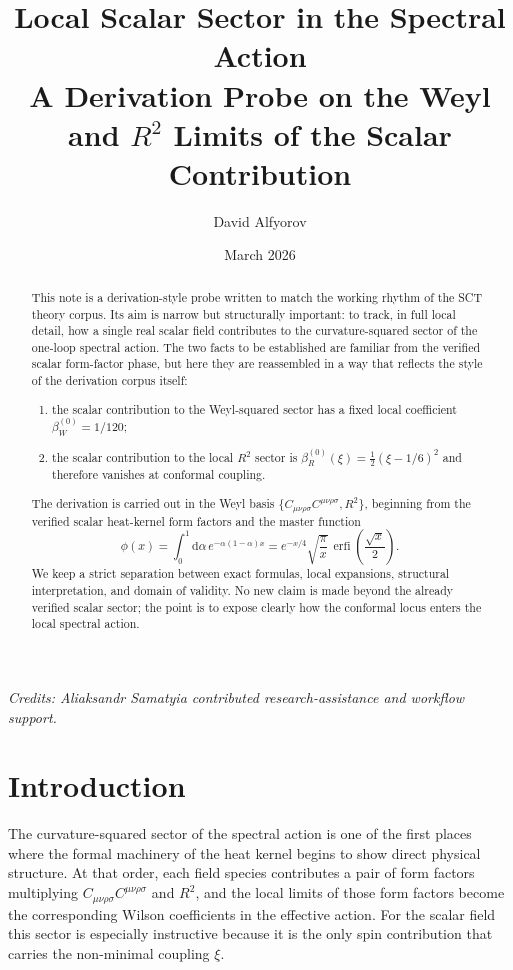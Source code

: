 \documentclass[11pt,a4paper]{article}
\title{%
  \textbf{Local Scalar Sector in the Spectral Action}\\[6pt]
  \large A Derivation Probe on the Weyl and $R^2$ Limits of the Scalar Contribution
}
\author{David Alfyorov}
\date{March 2026}
\newcommand{\dd}{\mathrm{d}}
\newcommand{\Weylsq}{C_{\mu\nu\rho\sigma}C^{\mu\nu\rho\sigma}}
\newcommand{\Rsq}{R^2}
\DeclareMathOperator{\erfi}{erfi}
\theoremstyle{definition}
\theoremstyle{remark}
\begin{document}
\maketitle

\begin{center}
\small\textit{Credits: Aliaksandr Samatyia contributed research-assistance and workflow support.}
\end{center}

\thispagestyle{empty}

\begin{abstract}
This note is a derivation-style probe written to match the working rhythm of
the SCT theory corpus.  Its aim is narrow but structurally important: to
track, in full local detail, how a single real scalar field contributes to
the curvature-squared sector of the one-loop spectral action.  The two facts
to be established are familiar from the verified scalar form-factor phase,
but here they are reassembled in a way that reflects the style of the
derivation corpus itself:
\begin{enumerate}[nosep]
  \item the scalar contribution to the Weyl-squared sector has a fixed local
  coefficient $\beta_W^{(0)} = 1/120$;
  \item the scalar contribution to the local $R^2$ sector is
  $\beta_R^{(0)}(\xi) = \frac{1}{2}(\xi - 1/6)^2$ and therefore vanishes at
  conformal coupling.
\end{enumerate}
The derivation is carried out in the Weyl basis $\{\Weylsq,\Rsq\}$, beginning
from the verified scalar heat-kernel form factors and the master function
\[
  \phi(x) = \int_0^1 \dd\alpha\, e^{-\alpha(1-\alpha)x}
  = e^{-x/4}\sqrt{\frac{\pi}{x}}\,
    \erfi\!\left(\frac{\sqrt{x}}{2}\right).
\]
We keep a strict separation between exact formulas, local expansions,
structural interpretation, and domain of validity.  No new claim is made
beyond the already verified scalar sector; the point is to expose clearly how
the conformal locus enters the local spectral action.
\end{abstract}

\tableofcontents
\newpage

\section{Introduction}
\label{sec:intro}

The curvature-squared sector of the spectral action is one of the first
places where the formal machinery of the heat kernel begins to show direct
physical structure.  At that order, each field species contributes a pair of
form factors multiplying $\Weylsq$ and $\Rsq$, and the local limits of those
form factors become the corresponding Wilson coefficients in the effective
action.  For the scalar field this sector is especially instructive because
it is the only spin contribution that carries the non-minimal coupling
$\xi$.
\end{document}
